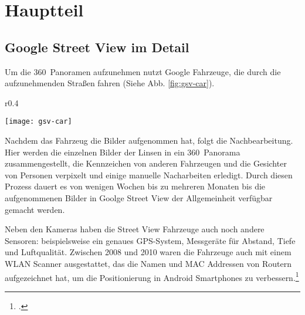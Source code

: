 \newpage

% 

\section{Hauptteil}\label{hauptteil}

\subsection{Google Street View im Detail}\label{street-view-detail}
Um die 360\degree\ Panoramen aufzunehmen nutzt Google Fahrzeuge, die durch die
aufzunehmenden Straßen fahren (Siehe Abb. \ref{fig:gsv-car}).

\begin{wrapfigure}{r}{0.4\textwidth}
  \caption{Google Street View Fahrzeug}\label{fig:gsv-car}
  \begin{center}
    \texttt{[image: gsv-car]}
    \\
    \cite[Quelle:][]{website:google-street-view:about}
  \end{center}
\end{wrapfigure}


Nachdem das Fahrzeug die Bilder aufgenommen hat, folgt die Nachbearbeitung. Hier
werden die einzelnen Bilder der Linsen in ein 360\degree\ Panorama zusammengestellt,
die Kennzeichen von anderen Fahrzeugen und die Gesichter von Personen verpixelt
und einige manuelle Nacharbeiten erledigt. Durch diesen Prozess dauert es von wenigen
Wochen bis zu mehreren Monaten bis die aufgenommenen Bilder in Goolge Street
View der Allgemeinheit verfügbar gemacht werden.

Neben den Kameras haben die Street View Fahrzeuge auch noch andere Sensoren:
beispielsweise ein genaues GPS-System, Messgeräte für Abstand, Tiefe und
Luftqualität. Zwischen 2008 und 2010 waren die Fahrzeuge auch mit einem WLAN
Scanner ausgestattet, das die Namen und MAC Addressen von Routern aufgezeichnet
hat, um die Positionierung in Android Smartphones zu verbessern.\footcite{website:trekview:gsv-sensors}

